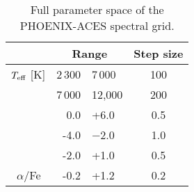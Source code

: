 
\begin{table}
    \centering
    \caption{Full parameter space of the {PHOENIX-ACES} spectral grid.}
    \begin{tabular}{lr@{ -- }lc}    %
        \toprule
        & \multicolumn{2}{c}{Range}       & Step size\\
        \midrule
        \( T_{\mathrm{eff}}{}\) [K] &  2\,300 & 7\,000  & 100 \\
        &  7\,000 & 12,000 & 200 \\ 
        \ \logg{}     &  0.0 & +6.0   & 0.5 \\
        \ \feh{}   &  -4.0 & $-$2.0  & 1.0 \\    %
        &  -2.0 & +1.0  & 0.5 \\
        \  \(\alpha\)/Fe &  -0.2 & +1.2  & 0.2 \\
        \bottomrule
    \end{tabular}
    \label{tab:phoenix}
\end{table}
